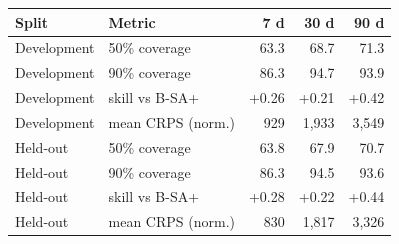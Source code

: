 \begin{tabular}{ll rrr}
\toprule
Split & Metric & 7 d & 30 d & 90 d\\
\midrule
Development & 50\% coverage & 63.3 & 68.7 & 71.3 \\
Development & 90\% coverage & 86.3 & 94.7 & 93.9 \\
Development & skill vs B-SA+ & +0.26 & +0.21 & +0.42 \\
Development & mean CRPS (norm.) & 929 & 1{,}933 & 3{,}549 \\
\midrule
Held-out & 50\% coverage & 63.8 & 67.9 & 70.7 \\
Held-out & 90\% coverage & 86.3 & 94.5 & 93.6 \\
Held-out & skill vs B-SA+ & +0.28 & +0.22 & +0.44 \\
Held-out & mean CRPS (norm.) & 830 & 1{,}817 & 3{,}326 \\
\bottomrule
\end{tabular}
